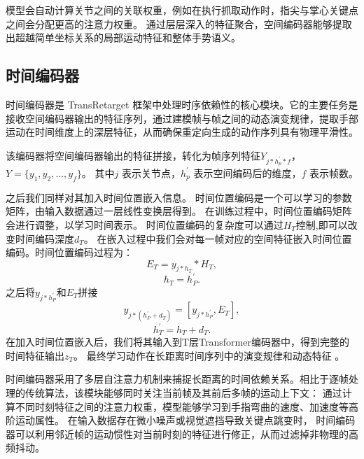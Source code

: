 模型会自动计算关节之间的关联权重，例如在执行抓取动作时，指尖与掌心关键点之间会分配更高的注意力权重。
通过层层深入的特征聚合，空间编码器能够提取出超越简单坐标关系的局部运动特征和整体手势语义。

\subsection{时间编码器}
时间编码器是 TransRetarget 框架中处理时序依赖性的核心模块。它的主要任务是接收空间编码器输出的特征序列，通过建模帧与帧之间的动态演变规律，提取手部运动在时间维度上的深层特征，从而确保重定向生成的动作序列具有物理平滑性。

该编码器将空间编码器输出的特征拼接，转化为帧序列特征$Y_{j*h^{'}_{p}*f}$，
$Y = \{y_1, y_2, \ldots, y_f\}$。
其中$j$ 表示关节点，$h^{'}_{p}$ 表示空间编码后的维度，$f$ 表示帧数。

之后我们同样对其加入时间位置嵌入信息。
时间位置编码是一个可以学习的参数矩阵，由输入数据通过一层线性变换层得到。
在训练过程中，时间位置编码矩阵会进行调整，以学习时间表示。
时间位置编码的复杂度可以通过$H_{T}$控制,即可以改变时间编码深度$d_{T}$。
在嵌入过程中我们会对每一帧对应的空间特征嵌入时间位置编码。时间位置编码过程为：
\begin{equation}
  E_{T} = y_{j*h_{T}} * H_{T},
\end{equation}
\begin{equation}
h_{T} = h^{'}_{P}.
\end{equation}
之后将$y_{j*h^{'}_{P}}$和$E_{T}$拼接
\begin{equation}
y_{j*(h^{'}_{P}+d_{T})} = [y_{j*h^{'}_{P}} , E_{T}],
\end{equation}
\begin{equation}
h^{'}_{T} = h_{T}+d_{T}.
\end{equation}
在加入时间位置嵌入后，我们将其输入到T层Transformer编码器中，得到完整的时间特征输出$z_{T}$。
最终学习动作在长距离时间序列中的演变规律和动态特征 。

时间编码器采用了多层自注意力机制来捕捉长距离的时间依赖关系。相比于逐帧处理的传统算法，该模块能够同时关注当前帧及其前后多帧的运动上下文：
通过计算不同时刻特征之间的注意力权重，模型能够学习到手指弯曲的速度、加速度等高阶运动属性。
在输入数据存在微小噪声或视觉遮挡导致关键点跳变时，
时间编码器可以利用邻近帧的运动惯性对当前时刻的特征进行修正，从而过滤掉非物理的高频抖动。
